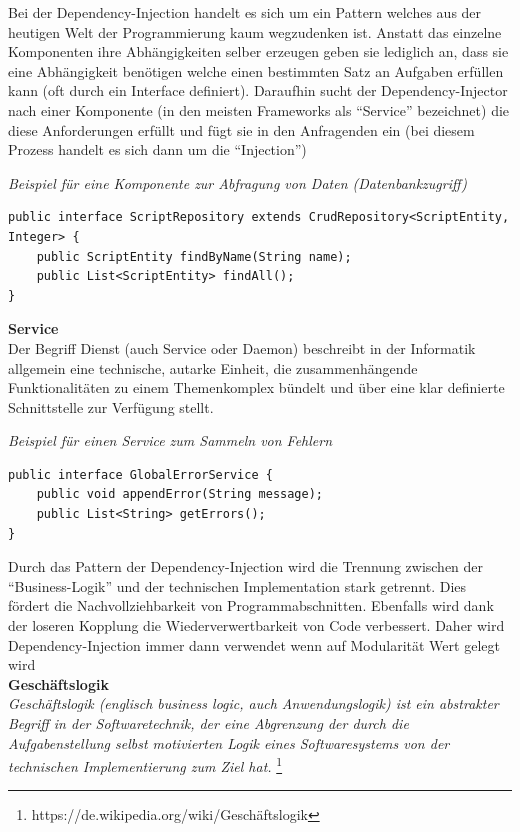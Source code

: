 Bei der Dependency-Injection handelt es sich um ein Pattern welches aus der heutigen Welt der Programmierung kaum wegzudenken ist. Anstatt das einzelne Komponenten ihre Abhängigkeiten selber erzeugen geben sie lediglich an, dass sie eine Abhängigkeit benötigen welche einen bestimmten Satz an Aufgaben erfüllen kann (oft durch ein Interface definiert). Daraufhin sucht der Dependency-Injector nach einer Komponente (in den meisten Frameworks als ``Service'' bezeichnet) die diese Anforderungen erfüllt und fügt sie in den Anfragenden ein (bei diesem Prozess handelt es sich dann um die ``Injection'') \\

\begin{minipage}{\textwidth}
\emph{Beispiel für eine Komponente zur Abfragung von Daten (Datenbankzugriff)}
\begin{lstlisting}
public interface ScriptRepository extends CrudRepository<ScriptEntity, Integer> {
	public ScriptEntity findByName(String name);
	public List<ScriptEntity> findAll();
}
\end{lstlisting} 
\end{minipage}


\textbf{Service}\\
Der Begriff Dienst (auch Service oder Daemon) beschreibt in der Informatik allgemein eine technische, autarke Einheit, die zusammenhängende Funktionalitäten zu einem Themenkomplex bündelt und über eine klar definierte Schnittstelle zur Verfügung stellt.\\
 
\begin{minipage}{\textwidth}
\emph{Beispiel für einen Service zum Sammeln von Fehlern}
\begin{lstlisting}
public interface GlobalErrorService {
	public void appendError(String message);
	public List<String> getErrors();
}
\end{lstlisting}
\end{minipage}

Durch das Pattern der Dependency-Injection wird die Trennung zwischen der ``Business-Logik'' und der technischen Implementation stark getrennt. Dies fördert die Nachvollziehbarkeit von Programmabschnitten. Ebenfalls wird dank der loseren Kopplung die Wiederverwertbarkeit von Code verbessert. Daher wird Dependency-Injection immer dann verwendet wenn auf Modularität Wert gelegt wird \\


\textbf{Geschäftslogik} \\
\emph{\glqq   
Geschäftslogik (englisch business logic, auch Anwendungslogik) ist ein abstrakter Begriff in der Softwaretechnik, der eine Abgrenzung der durch die Aufgabenstellung selbst motivierten Logik eines Softwaresystems von der technischen Implementierung zum Ziel hat.
\grqq} \footnote{https://de.wikipedia.org/wiki/Geschäftslogik} \\

